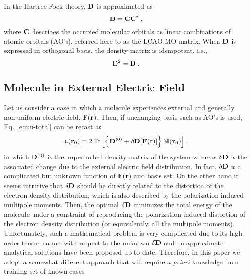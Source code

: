 \documentclass[aip,graphicx]{revtex4-1}
\newcommand{\BM}[1]{\bm{#1}}
\DeclareMathOperator{\Tr}{Tr}
\begin{document}
In the Hartree\hyp{}Fock theory, ${\bf D}$ is approximated as
%
\begin{equation}
 {\bf D} = {\bf C}{\bf C}^\dagger \;,
\end{equation}
%
where ${\bf C}$ describes the occupied molecular orbitals as linear combinations
of atomic orbitals (AO's), referred here to as the LCAO-MO matrix.
When ${\bf D}$ is expressed in orthogonal basis, the density matrix is idempotent, i.e.,
%
\begin{equation}
 {\bf D}^2 = {\bf D} \;.
\end{equation}
%

%
\subsection{Molecule in External Electric Field}

Let us consider a case in which a molecule experiences external and generally non\hyp{}uniform electric field,
${\bf F}({\bf r})$. 
Then, if unchanging basis such as AO's is used, Eq.~\eqref{e:mu-total} can be recast as
%
\begin{equation}
 {\BM{\upmu}}({\bf r}_0) = 
     2 \Tr{ 
         \left[ 
              \left\{ {\bf D}^{(0)} + \delta {\bf D}[{\bf F}({\bf r})] \right\}  {\mathbb{M}({\bf r}_0)}
         \right] } \;,
\end{equation}
%
in which ${\bf D}^{(0)}$ is the unperturbed density matrix of the system whereas
$\delta {\bf D}$ is the associated change due to the external electric field distribution. 
In fact, $\delta {\bf D}$ is a complicated
but unknown function of ${\bf F}({\bf r})$ and basis set. 
On the other hand it seems intuitive that $\delta {\bf D}$ should 
be directly related to the distortion of the electron density distribution, which is also described
by the polarization\hyp{}induced multipole moments. Then, the optimal $\delta {\bf D}$ minimizes
the total energy of the molecule under a constraint of reproducing the polarization\hyp{}induced 
distortion of the electron density distribution (or equivalently, all the multipole moments). 
Unfortunately, such a mathematical problem is very complicated due to its high\hyp{}order tensor nature
with respect to the unknown $\delta {\bf D}$ and no approximate analytical solutions have been proposed
up to date. Therefore, in this paper we adopt a somewhat different
approach that will require \emph{a priori} knowledge from training set of known cases.
\end{document}
